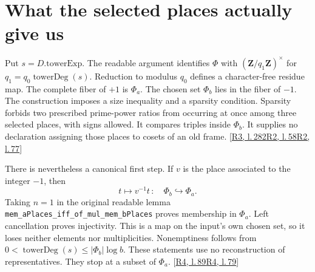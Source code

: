 \documentclass[12pt,letterpaper]{article}
\newcommand{\id}[1]{{\small\nolinkurl{#1}}}
\begin{document}
\section{What the selected places actually give us}
Put $s=D.\mathrm{towerExp}$. The readable argument identifies $\Phi$ with $(\mathbf Z/q_1\mathbf Z)^\times$ for $q_1=q_0\operatorname{towerDeg}(s)$. Reduction to modulus $q_0$ defines a character-free residue map. The complete fiber of $+1$ is $\Phi_a$. The chosen set $\Phi_b$ lies in the fiber of $-1$. The construction imposes a size inequality and a sparsity condition. Sparsity forbids two prescribed prime-power ratios from occurring at once among three selected places, with signs allowed. It compares triples inside $\Phi_b$. It supplies no declaration assigning those places to cosets of an old frame. {\footnotesize\sffamily\color{mute}[\href{https://github.com/leanprover-community/riemann-hypothesis/blob/e063a923620ee7787b4a1270421478645bf66bdb/src/New/Reduction/Data/FieldsAndPlaces.lean#L282}{R3, l.\,282}\enspace \href{https://github.com/leanprover-community/riemann-hypothesis/blob/e063a923620ee7787b4a1270421478645bf66bdb/src/New/Reduction/Data/AdmissibleData.lean#L58}{R2, l.\,58}\enspace \href{https://github.com/leanprover-community/riemann-hypothesis/blob/e063a923620ee7787b4a1270421478645bf66bdb/src/New/Reduction/Data/AdmissibleData.lean#L77}{R2, l.\,77}]}

There is nevertheless a canonical first step. If $v$ is the place associated to the integer $-1$, then
\[
           t\longmapsto v^{-1}t\, :\quad\Phi_b\hookrightarrow\Phi_a .
\]
Taking $n=1$ in the original readable lemma \id{mem_aPlaces_iff_of_mul_mem_bPlaces} proves membership in $\Phi_a$. Left cancellation proves injectivity. This is a map on the input's own chosen set, so it loses neither elements nor multiplicities. Nonemptiness follows from $0<\operatorname{towerDeg}(s)\leq|\Phi_b|\log b$. These statements use no reconstruction of representatives. They stop at a subset of $\Phi_a$.
 {\footnotesize\sffamily\color{mute}[\href{https://github.com/leanprover-community/riemann-hypothesis/blob/e063a923620ee7787b4a1270421478645bf66bdb/src/New/Reduction/PrimeSums.lean#L89}{R4, l.\,89}\enspace \href{https://github.com/leanprover-community/riemann-hypothesis/blob/e063a923620ee7787b4a1270421478645bf66bdb/src/New/Reduction/PrimeSums.lean#L79}{R4, l.\,79}]}
\end{document}
